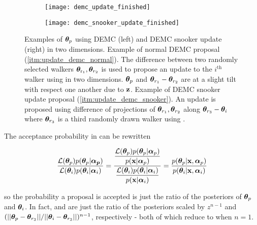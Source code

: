 \begin{figure}
\centering
\begin{subfigure}[t]{0.5\textwidth}
\centering
\texttt{[image: demc\_update\_finished]}
\end{subfigure}%
\begin{subfigure}[t]{0.5\textwidth}
\centering
\texttt{[image: demc\_snooker\_update\_finished]}
\end{subfigure}
\caption{Examples of $\boldsymbol{\theta}_p$ using DEMC (left) and DEMC snooker update (right) in two dimensions.  Example of normal DEMC
proposal (\cref{itm:update_demc_normal}).  The difference between two randomly selected walkers
$\boldsymbol{\theta}_{\mathrm{r_1}}, \boldsymbol{\theta}_{r_2}$ is used to propose an update to the $i^{\mathrm{th}}$ walker using
 in two dimensions.  $\boldsymbol{\theta}_p$ and
$\boldsymbol{\theta}_{r_1} - \boldsymbol{\theta}_{r_2}$ are at a slight tilt with respect one another due to $\mathbf{z}$.  Example
of DEMC snooker update proposal (\cref{itm:update_demc_snooker}).  An update is proposed using difference of projections of
$\boldsymbol{\theta}_{r_1}, \boldsymbol{\theta}_{r_2}$ along $\boldsymbol{\theta}_{r_3} - \boldsymbol{\theta}_i$ where
$\boldsymbol{\theta}_{r_3}$ is a third randomly drawn walker using .}
\label{fig:elifetime_fit_mcmc_demc_diagram}
\end{figure}

The acceptance probability in  can be rewritten

\vspace{-5pt}

\begin{equation}
\frac{\mathcal{L}(\boldsymbol{\theta}_p) p(\boldsymbol{\theta}_p|\boldsymbol{\alpha_p})}
{\mathcal{L}(\boldsymbol{\theta}_i) p(\boldsymbol{\theta}_i|\boldsymbol{\alpha}_i)} =
\dfrac{\dfrac{\mathcal{L}(\boldsymbol{\theta}_p) p(\boldsymbol{\theta}_p|\boldsymbol{\alpha}_p)}{p(\mathbf{x}|\boldsymbol{\alpha}_p)}}
{\dfrac{\mathcal{L}(\boldsymbol{\theta}_i) p(\boldsymbol{\theta}_i|\boldsymbol{\alpha}_i)}{p(\mathbf{x}|\boldsymbol{\alpha}_i)}} =
\frac{p(\boldsymbol{\theta}_p|\mathbf{x}, \boldsymbol{\alpha}_p)}{p(\boldsymbol{\theta}_i|\mathbf{x}, \boldsymbol{\alpha}_i)}
\label{eq:elifetime_fit_mcmc_acc_ratio}
\end{equation}

\noindent so the probability a proposal is accepted is just the ratio of the posteriors of $\boldsymbol{\theta}_p$ and
$\boldsymbol{\theta}_i$.  In fact,  and
 are just the ratio of the posteriors scaled by $z^{n-1}$ and
$(||\boldsymbol{\theta}_p - \boldsymbol{\theta}_{r_3}|| / ||\boldsymbol{\theta}_i - \boldsymbol{\theta}_{r_3}||)^{n - 1}$, respectively - both
of which reduce to  when $n = 1$.

